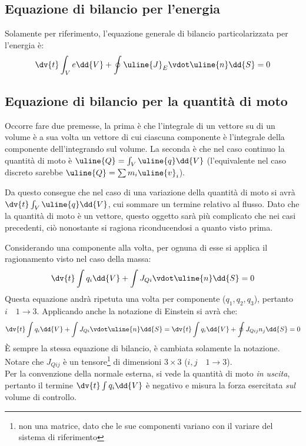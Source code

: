 \subsection{Equazione di bilancio per l'energia}
Solamente per riferimento, l'equazione generale di bilancio particolarizzata per l'energia è:
	\begin{equation*}
		\dv{t} \int_V e \dd{V} + \oint \uline{J}_E \vdot \uline{n} \dd{S} = 0
	\end{equation*}
%
\subsection{Equazione di bilancio per la quantità di moto}
Occorre fare due premesse, la prima è che l'integrale di un vettore su di un volume è a sua volta un vettore di cui ciascuna componente è l'integrale della componente dell'integrando sul volume.
La seconda è che nel caso continuo la quantità di moto è $\uline{Q} = \int_V \uline{q} \dd{V} $ (l'equivalente nel caso discreto sarebbe $\uline{Q} = \sum m_i \uline{v}_i$).

Da questo consegue che nel caso di una variazione della quantità di moto si avrà $\dv{t} \int_V \uline{q} \dd{V}$, cui sommare un termine relativo al flusso.
Dato che la quantità di moto è un vettore, questo oggetto sarà più complicato che nei casi precedenti, ciò nonostante si ragiona riconducendosi a quanto visto prima.

Considerando una componente alla volta, per ognuna di esse si applica il ragionamento visto nel caso della massa:
	\begin{equation*}
		\dv{t} \int q_i \dd{V} + \int J_{Qi} \vdot \uline{n} \dd{S} = 0
	\end{equation*}
Questa equazione andrà ripetuta una volta per componente ($q_1, q_2, q_3$), pertanto $i \quad 1 \rightarrow 3$.
Applicando anche la notazione di Einstein si avrà che:
	\begin{equation*}
		\dv{t} \int q_i \dd{V} + \int J_{Qi} \vdot \uline{n} \dd{S} = \dv{t} \int q_i \dd{V} + \oint J_{Qij} n_j \dd{S} = 0
	\end{equation*}
È sempre la stessa equazione di bilancio, è cambiata solamente la notazione. \\
Notare che $J_{Qij}$ è un tensore\footnote{non una matrice, dato che le sue componenti variano con il variare del sistema di riferimento} di dimensioni $3\times3$ ($i, j \quad 1 \to 3$).\\
Per la convenzione della normale esterna, si vede la quantità di moto \textit{in uscita}, pertanto il termine $\dv{t} \int q_i \dd{V}$ è negativo e misura la forza esercitata \textit{sul} volume di controllo.
%
